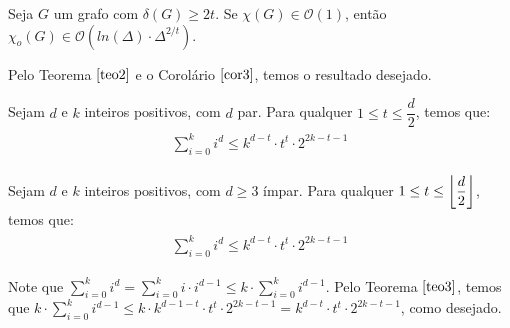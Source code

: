 \begin{cor}
	Seja $G$ um grafo com $\delta(G) \geq 2t$. Se $\chi(G) \in \mathcal{O}(1)$, então $\chi_o(G) \in \mathcal{O}(ln(\Delta) {\cdot} \Delta^{2/t}) $.
\end{cor}
Pelo Teorema $\ref{teo2}$ e o Corolário $\ref{cor3}$, temos o resultado desejado. \newbegin

\begin{teo}
	\label{teo3}   
	Sejam $d$ e $k$ inteiros positivos, com $d$ par. Para qualquer $1 \leq t \leq \dfrac{d}{2}$, temos que: 
	\begin{align}
		\begin{split}
			\sum\limits_{i = 0}^{ k }i^{d}   \leq k^{d-t} {\cdot} t^t  {\cdot} 2^{2k-t-1} 
		\end{split} 
	\end{align}
	
\end{teo} \newbegin

\begin{cor}
	Sejam $d$ e $k$ inteiros positivos, com $d \geq 3$ ímpar. Para qualquer $1 \leq t \leq \left \lfloor \dfrac{d}{2} \right \rfloor$, temos que: 
	\begin{align}
		\begin{split}
			\sum\limits_{i = 0}^{ k }i^{d}   \leq k^{d-t} {\cdot} t^t  {\cdot} 2^{2k-t-1} 
		\end{split} 
	\end{align}
\end{cor}

Note que $\sum\limits_{i = 0}^{ k }i^{d} = \sum\limits_{i = 0}^{ k }i {\cdot} i^{d-1} \leq k {\cdot} \sum\limits_{i = 0}^{ k } i^{d-1}$. Pelo Teorema $\ref{teo3}$, temos que $k {\cdot} \sum\limits_{i = 0}^{ k }i^{d-1} \leq k {\cdot} k^{d-1-t} {\cdot} t^t  {\cdot} 2^{2k-t-1} = k^{d-t} {\cdot} t^t  {\cdot} 2^{2k-t-1} $, como desejado. 